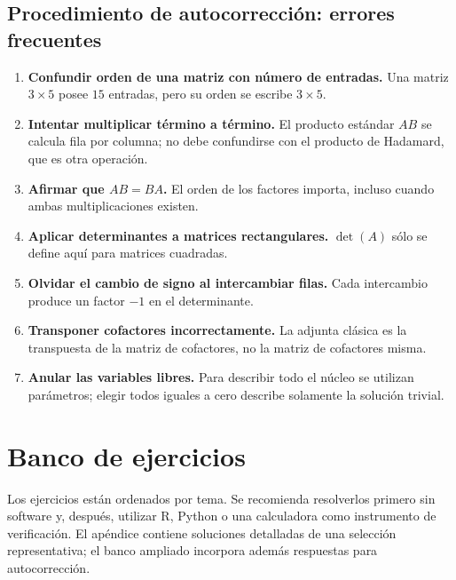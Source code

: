 \documentclass[12pt]{article}
\theoremstyle{remark}
\begin{document}
\subsection{Procedimiento de autocorrección: errores frecuentes}
\begin{enumerate}
\item \textbf{Confundir orden de una matriz con número de entradas.} Una matriz $3\times5$ posee $15$ entradas, pero su orden se escribe $3\times5$.
\item \textbf{Intentar multiplicar término a término.} El producto estándar $AB$ se calcula fila por columna; no debe confundirse con el producto de Hadamard, que es otra operación.
\item \textbf{Afirmar que $AB=BA$.} El orden de los factores importa, incluso cuando ambas multiplicaciones existen.
\item \textbf{Aplicar determinantes a matrices rectangulares.} $\det(A)$ sólo se define aquí para matrices cuadradas.
\item \textbf{Olvidar el cambio de signo al intercambiar filas.} Cada intercambio produce un factor $-1$ en el determinante.
\item \textbf{Transponer cofactores incorrectamente.} La adjunta clásica es la transpuesta de la matriz de cofactores, no la matriz de cofactores misma.
\item \textbf{Anular las variables libres.} Para describir todo el núcleo se utilizan parámetros; elegir todos iguales a cero describe solamente la solución trivial.
\end{enumerate}


\section{Banco de ejercicios}
Los ejercicios están ordenados por tema. Se recomienda resolverlos primero sin software y, después, utilizar R, Python o una calculadora como instrumento de verificación. El apéndice contiene soluciones detalladas de una selección representativa; el banco ampliado incorpora además respuestas para autocorrección.
\end{document}
